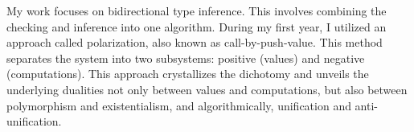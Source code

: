 My work focuses on bidirectional type inference. This involves combining the
checking and inference into one algorithm. During my first year, I utilized an
approach called polarization, also known as call-by-push-value. This method
separates the system into two subsystems: positive (values) and negative
(computations). This approach crystallizes the dichotomy and unveils the
underlying dualities not only between values and computations, but also between
polymorphism and existentialism, and algorithmically, unification and
anti-unification.


